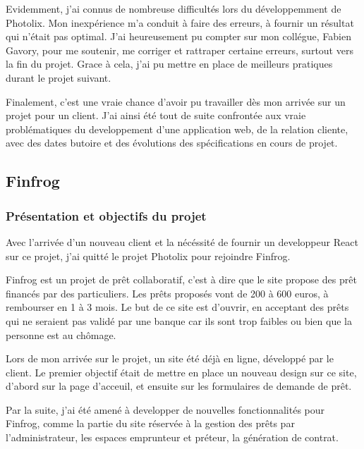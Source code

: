 \documentclass[12pt,a4paper]{article}
\begin{document}
  \bigskip

  Evidemment, j'ai connus de nombreuse difficultés lors du développemment
  de Photolix. Mon inexpérience m'a conduit à faire des erreurs, à fournir
  un résultat qui n'était pas optimal. J'ai heureusement pu compter sur
  mon collégue, Fabien Gavory, pour me soutenir, me corriger et rattraper
  certaine erreurs, surtout vers la fin du projet. Grace à cela, j'ai pu
  mettre en place de meilleurs pratiques durant le projet suivant.

  \bigskip

  Finalement, c'est une vraie chance d'avoir pu travailler dès mon arrivée
  sur un projet pour un client. J'ai ainsi été tout de suite confrontée
  aux vraie problématiques du developpement d'une application web, de la
  relation cliente, avec des dates butoire et des évolutions des
  spécifications en cours de projet.

  \subsection{Finfrog}\label{finfrog}

  \subsubsection{Présentation et objectifs du
  projet}\label{pruxe9sentation-et-objectifs-du-projet-1}

  \bigskip

  Avec l'arrivée d'un nouveau client et la nécéssité de fournir un
  developpeur React sur ce projet, j'ai quitté le projet Photolix pour
  rejoindre Finfrog.

  \bigskip

  Finfrog est un projet de prêt collaboratif, c'est à dire que le site
  propose des prêt financés par des particuliers. Les prêts proposés vont
  de 200 à 600 euros, à rembourser en 1 à 3 mois. Le but de ce site est
  d'ouvrir, en acceptant des prêts qui ne seraient pas validé par une
  banque car ils sont trop faibles ou bien que la personne est au chômage.

  \bigskip

  Lors de mon arrivée sur le projet, un site été déjà en ligne, développé
  par le client. Le premier objectif était de mettre en place un nouveau
  design sur ce site, d'abord sur la page d'acceuil, et ensuite sur les
  formulaires de demande de prêt.

  \bigskip

  Par la suite, j'ai été amené à developper de nouvelles fonctionnalités
  pour Finfrog, comme la partie du site réservée à la gestion des prêts
  par l'administrateur, les espaces emprunteur et préteur, la génération
  de contrat.
\end{document}
